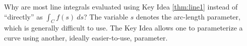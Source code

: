 {Why are most line integrals evaluated using Key Idea \ref{thm:line1} instead of ``directly'' as $\int_C f(s)\ ds$?
}
{The variable $s$ denotes the arc-length parameter, which is generally difficult to use. The Key Idea allows one to parameterize a curve using another, ideally easier-to-use, parameter.
}
